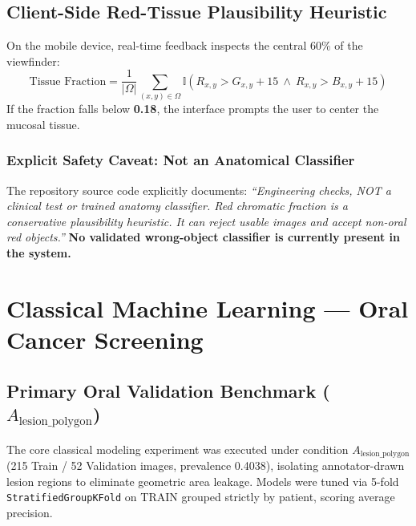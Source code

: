 \documentclass[11pt,a4paper]{report}
\begin{document}
\section{Client-Side Red-Tissue Plausibility Heuristic}
On the mobile device, real-time feedback inspects the central 60\% of the viewfinder:
\begin{equation}
  \text{Tissue Fraction} = \frac{1}{|\Omega|} \sum_{(x,y) \in \Omega} \mathbb{I}\left( R_{x,y} > G_{x,y} + 15 \ \land \ R_{x,y} > B_{x,y} + 15 \right)
\end{equation}
If the fraction falls below \textbf{0.18}, the interface prompts the user to center the mucosal tissue.

\subsection{Explicit Safety Caveat: Not an Anatomical Classifier}
The repository source code explicitly documents: \textit{``Engineering checks, NOT a clinical test or trained anatomy classifier. Red chromatic fraction is a conservative plausibility heuristic. It can reject usable images and accept non-oral red objects.''} \textbf{No validated wrong-object classifier is currently present in the system.}

\chapter{Classical Machine Learning --- Oral Cancer Screening}

\section{Primary Oral Validation Benchmark ($A_\text{lesion\_polygon}$)}
The core classical modeling experiment was executed under condition $A_\text{lesion\_polygon}$ (215 Train / 52 Validation images, prevalence 0.4038), isolating annotator-drawn lesion regions to eliminate geometric area leakage. Models were tuned via 5-fold \texttt{StratifiedGroupKFold} on TRAIN grouped strictly by patient, scoring average precision.
\end{document}

